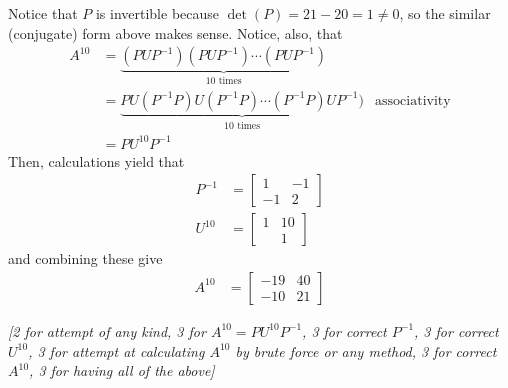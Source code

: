 \documentclass[answers,11pt]{exam}
\theoremstyle{definition}
\DeclareMathOperator{\1}{\mathbbm{1}}
\begin{document}
\begin{questions}
\begin{solution}
	Notice that $P$ is invertible because $\det(P) = 21 - 20 = 1 \neq 0$, so the similar (conjugate) form above makes sense. Notice, also, that
	\begin{align*}
	A^{10} &= \underbrace{ (PUP^{-1}) (PUP^{-1}) \cdots (PUP^{-1})}_{10 \text{ times}} & \\
	&=\underbrace{ PU (P^{-1}P) U (P^{-1} P) \cdots (P^{-1}P) UP^{-1})}_{10 \text{ times}}  & \text{associativity} \\
	&= P U^{10} P^{-1} 
	\end{align*}
	Then, calculations yield that
	\begin{align*}
		P^{-1} &= \begin{bmatrix}
		1 & -1 \\ -1 & 2
		\end{bmatrix} \\
		U^{10} &= \begin{bmatrix}
		1 & 10 \\ & 1
		\end{bmatrix}
	\end{align*}
	and combining these give
	\begin{align*}
	A^{10} &= \begin{bmatrix}
	-19 & 40 \\ -10 & 21
	\end{bmatrix}
	\end{align*}
	
	\textit{[2 for attempt of any kind, 3 for $A^{10} = P U^{10} P^{-1} $, 3 for correct $P^{-1}$, 3 for correct $U^{10}$, 3 for attempt at calculating $A^{10}$ by brute force or any method, 3 for correct $A^{10}$, 3 for having all of the above]}
\end{solution}



\end{questions}
\end{document}
